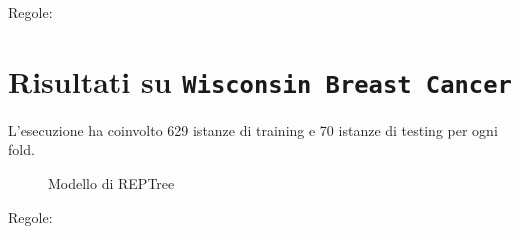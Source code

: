 \noindent
\normalsize Regole:
\scriptsize

\pagebreak

\section{Risultati su \texttt{Wisconsin Breast Cancer}}

\normalsize L'esecuzione ha coinvolto 629 istanze di training e 70 istanze di testing per ogni fold.


\begin{mdframed}[frametitle=Esecuzione NaiveBayesSimple]
	\footnotesize
\end{mdframed}


\footnotesize

\begin{mdframed}[frametitle=Esecuzione REPTree]
	\footnotesize
\end{mdframed}


\begin{figure}[htb]
	\caption{Modello di REPTree}
\end{figure}

\begin{mdframed}[frametitle=Esecuzione JRip]
	\footnotesize
\end{mdframed}


\noindent
\normalsize Regole:
\footnotesize